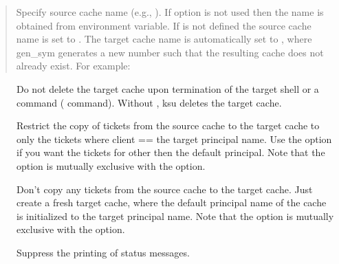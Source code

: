 \documentclass[letterpaper,10pt,english]{sphinxmanual}
\begin{document}
 
\begin{quote}

Specify source cache name (e.g., ).  If
 option is not used then the name is obtained from
 environment variable.  If  is not
defined the source cache name is set to .
The target cache name is automatically set to , where gen\_sym generates a new number such that
the resulting cache does not already exist.  For example:

%
\begin{sphinxVerbatim}[commandchars=\\\{\}]
\end{sphinxVerbatim}
\end{quote}
\begin{description}
\item[{}] \leavevmode
Do not delete the target cache upon termination of the target
shell or a command ( command).  Without , ksu deletes
the target cache.

\item[{}] \leavevmode
Restrict the copy of tickets from the source cache to the target
cache to only the tickets where client == the target principal
name.  Use the  option if you want the tickets for other then
the default principal.  Note that the  option is mutually
exclusive with the  option.

\item[{}] \leavevmode
Don’t copy any tickets from the source cache to the target cache.
Just create a fresh target cache, where the default principal name
of the cache is initialized to the target principal name.  Note
that the  option is mutually exclusive with the 
option.

\item[{}] \leavevmode
Suppress the printing of status messages.

\end{description}
\end{document}
